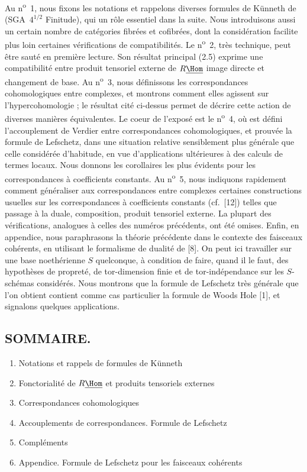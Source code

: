 Au n\textsuperscript{o}~1, nous fixons les notations et rappelons diverses formules de Künneth de (SGA~$4^{1/2}$ Finitude), qui  un rôle essentiel dans la suite. Nous introduisons aussi un certain nombre de catégories fibrées et cofibrées, dont la considération facilite plus loin certaines vérifications de compatibilités. Le n\textsuperscript{o}~2, très technique, peut être sauté en première lecture. Son résultat principal (2.5) exprime une compatibilité entre produit tensoriel externe de $R\underline{\Hom}$ image directe et changement de base. Au n\textsuperscript{o}~3, nous définissons les correspondances cohomologiques entre complexes, et montrons comment elles agissent sur l'hypercohomologie ; le résultat cité ci-dessus permet de décrire cette action de diverses manières équivalentes. Le coeur de l'exposé est le n\textsuperscript{o}~4, où est défini l'accouplement de Verdier entre correspondances cohomologiques, et prouvée la formule de Lefschetz, dans une situation relative sensiblement plus générale que celle considérée d'habitude, en vue d'applications ultérieures à des calculs de termes locaux. Nous donnons les corollaires les plus évidents pour les correspondances à coefficients constants. Au n\textsuperscript{o}~5, nous indiquons rapidement comment généraliser aux correspondances entre complexes certaines constructions usuelles sur les correspondances à coefficients constants (cf.~[12]) telles que passage à la duale, composition, produit tensoriel externe. La plupart des vérifications, analogues à celles des numéros précédents, ont été omises. Enfin, en appendice, nous paraphrasons la théorie précédente dans le contexte des faisceaux cohérents, en utilisant le formalisme de dualité de [8]. On peut ici travailler sur une base noethérienne $S$ quelconque, à condition de faire, quand il le faut, des hypothèses de propreté, de tor-dimension finie et de tor-indépendance sur les $S$-schémas considérés. Nous montrons que la formule de Lefschetz très générale que l'on obtient contient comme cas particulier la formule de Woods Hole [1], et signalons quelques applications.

\subsection*{SOMMAIRE.}
\begin{enumerate}[label=\arabic*.]
\item
Notations et rappels de formules de Künneth
\item Fonctorialité de $R\underline{\Hom}$ et produits tensoriels externes
\item Correspondances cohomologiques
\item Accouplements de correspondances. Formule de Lefschetz
\item Compléments
\item Appendice. Formule de Lefschetz pour les faisceaux cohérents
\end{enumerate}

